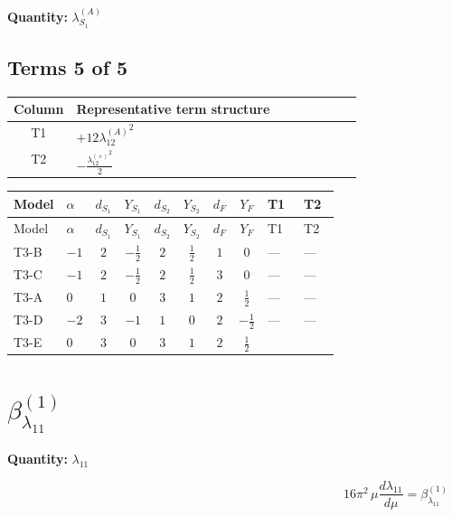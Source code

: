 \documentclass[8pt]{article}
\begin{document}
\begin{landscape}
\begin{longtable}{@{}llcccccc >{\raggedright\arraybackslash}p{0.21\linewidth} >{\raggedright\arraybackslash}p{0.21\linewidth} >{\raggedright\arraybackslash}p{0.21\linewidth}@{}}
\midrule
\bottomrule
\end{longtable}
\clearpage
\noindent\textbf{Quantity: }$\lambda_{S_1}^{(A)}$\par\smallskip
\subsection*{Terms 5 of 5}
\begin{center}
\begin{tabular}{@{}c >{\raggedright\arraybackslash}p{0.82\linewidth}@{}}
\toprule
Column & Representative term structure \\
\midrule
T1 & \(\displaystyle +12 {\lambda_{12}^{(A)}}^2\) \\
\midrule
T2 & \(\displaystyle -\frac{{\lambda_{12}^{(\times)}}^2}{2}\) \\
\midrule
\bottomrule
\end{tabular}
\end{center}
\smallskip
\tiny
\begin{longtable}{@{}llcccccc >{\raggedright\arraybackslash}p{0.21\linewidth} >{\raggedright\arraybackslash}p{0.21\linewidth}@{}}
\toprule
Model & $\alpha$ & $d_{S_1}$ & $Y_{S_1}$ & $d_{S_2}$ & $Y_{S_2}$ & $d_F$ & $Y_F$ & T1 & T2 \\
\midrule
\endfirsthead
\toprule
Model & $\alpha$ & $d_{S_1}$ & $Y_{S_1}$ & $d_{S_2}$ & $Y_{S_2}$ & $d_F$ & $Y_F$ & T1 & T2 \\
\midrule
\endhead
T3-B & $-1$ & $2$ & $-\frac{1}{2}$ & $2$ & $\frac{1}{2}$ & $1$ & $0$ & --- & --- \\
\midrule
T3-C & $-1$ & $2$ & $-\frac{1}{2}$ & $2$ & $\frac{1}{2}$ & $3$ & $0$ & --- & --- \\
\midrule
T3-A & $0$ & $1$ & $0$ & $3$ & $1$ & $2$ & $\frac{1}{2}$ & --- & --- \\
\midrule
T3-D & $-2$ & $3$ & $-1$ & $1$ & $0$ & $2$ & $-\frac{1}{2}$ & --- & --- \\
\midrule
T3-E & $0$ & $3$ & $0$ & $3$ & $1$ & $2$ & $\frac{1}{2}$ & \scriptsize\adjustbox{max width=\linewidth}{$\begin{gathered} +12 {\lambda_{12}^{(A)}}^2\end{gathered}$} & \scriptsize\adjustbox{max width=\linewidth}{$\begin{gathered} -\frac{{\lambda_{12}^{(\times)}}^2}{2}\end{gathered}$} \\
\midrule
\bottomrule
\end{longtable}
\clearpage
\section*{$\beta_{\lambda_{11}}^{(1)}$}
\noindent\textbf{Quantity: }$\lambda_{11}$\par\smallskip
\[16\pi^2\,\mu\frac{d \lambda_{11}}{d\mu}=\beta_{\lambda_{11}}^{(1)}\]

\end{landscape}
\end{document}
